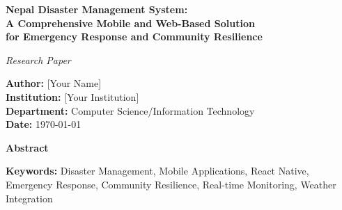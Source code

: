 \documentclass[12pt,a4paper]{article}
\begin{document}
\begin{titlepage}
    \centering
    \vspace*{2cm}
    
    {\Huge\bfseries Nepal Disaster Management System:\\
    A Comprehensive Mobile and Web-Based Solution\\
    for Emergency Response and Community Resilience\par}
    
    \vspace{1.5cm}
    
    {\Large\textit{Research Paper}\par}
    
    \vspace{2cm}
    
    {\large
    \textbf{Author:} [Your Name]\\
    \textbf{Institution:} [Your Institution]\\
    \textbf{Department:} Computer Science/Information Technology\\
    \textbf{Date:} \today\par}
    
    \vspace{2cm}
    
    {\large
    \textbf{Abstract}\par}
    
    \vspace{0.5cm}
    
    \begin{abstract}
    This paper presents a comprehensive analysis of the Nepal Disaster Management System, a multi-platform application designed to enhance emergency response capabilities and community resilience in disaster-prone regions. The system integrates mobile applications (React Native), web interfaces, and backend services to provide real-time disaster reporting, weather monitoring, donation management, and volunteer coordination. The research demonstrates how modern technology can be leveraged to create an effective disaster management ecosystem that addresses the unique challenges faced by Nepal's diverse geographical and climatic conditions.
    \end{abstract}
    
    \vfill
    
    {\large\textbf{Keywords:} Disaster Management, Mobile Applications, React Native, Emergency Response, Community Resilience, Real-time Monitoring, Weather Integration}
\end{titlepage}
\end{document}
